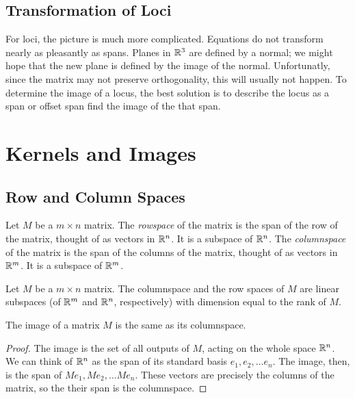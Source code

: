 \documentclass[fleqn]{report}
\begin{document}
\section{Transformation of Loci}

For loci, the picture is much more complicated. Equations do
not transform nearly as pleasantly as spans. Planes in $\mathbb{R}^3$
are defined by a normal; we might hope that the new plane is
defined by the image of the normal. Unfortunatly, since the
matrix may not preserve orthogonality, this will usually not
happen. To determine the image of a locus, the best solution
is to describe the locus as a span or offset span find the
image of the that span.

\chapter{Kernels and Images}

\section{Row and Column Spaces}

\begin{defn}
Let $M$ be a $m \times n$ matrix. The \emph{rowspace} of the
matrix is the span of the row of the matrix, thought of as
vectors in $\mathbb{R}^n$. It is a subspace of $\mathbb{R}^n$. The
\emph{columnspace} of the matrix is the span of the columns of
the matrix, thought of as vectors in $\mathbb{R}^m$. It is a
subspace of $\mathbb{R}^m$. 
\end{defn}

\begin{prop}
Let $M$ be a $m \times n$ matrix. The columnspace and the row
spaces of $M$ are linear subspaces (of $\mathbb{R}^m$ and $\mathbb{R}^n$,
respectively) with dimension equal to the rank of $M$.
\end{prop}

\begin{prop}
The image of a matrix $M$ is the same as its columnspace.
\end{prop}

\begin{proof}
The image is the set of all outputs of $M$, acting on the
whole space $\mathbb{R}^n$. We can think of $\mathbb{R}^n$ as the span of
its standard basis $e_1, e_2, \ldots e_n$. The image, then, is
the span of $Me_1, Me_2, \ldots Me_n$. These vectors are
precisely the columns of the matrix, so the their span is the
columnspace.
\end{proof}
\newpage
\end{document}
